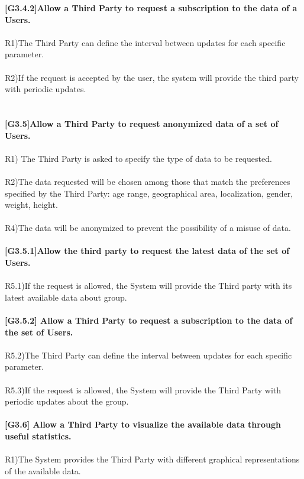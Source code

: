 \textbf{[G3.4.2]Allow a Third Party to request a subscription to the data of a Users.} \\ \\
R1)The Third Party can define the interval between updates for each specific parameter. \\ \\
R2)If the request is accepted by the user, the system will provide the third party with periodic updates. \\ \\ \\

\textbf{[G3.5]Allow a Third Party to request anonymized data of a set of Users.} \\ \\
R1) The Third Party is asked to specify the type of data to be requested. \\ \\
R2)The data requested will be chosen among those that match the preferences specified by the Third Party: age range, geographical area, localization, gender, weight, height. \\ \\
R4)The data will be anonymized to prevent the possibility of a misuse of data. \\ \\ 

\textbf{[G3.5.1]Allow the third party to request the latest data of the set of Users.} \\ \\
R5.1)If the request is allowed, the System will provide the Third party with its latest available data about group. \\ \\

\textbf{[G3.5.2] Allow a Third Party to request a subscription to the data of the set of Users.} \\ \\
R5.2)The Third Party can define the interval between updates for each specific parameter. \\ \\
R5.3)If the request is allowed, the System will provide the Third Party with periodic updates about the group. \\ \\ 

\textbf{[G3.6] Allow a Third Party to visualize the available data through useful statistics.} \\ \\
R1)The System provides the Third Party with different graphical representations of the available data. \\ \\

